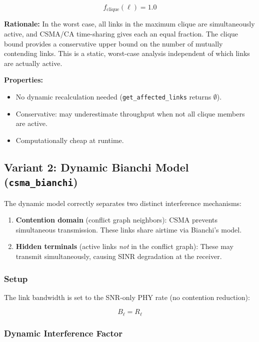 \documentclass[11pt,letterpaper]{article}
\begin{document}
\begin{equation}
f_\text{clique}(\ell) = 1.0
\end{equation}

\textbf{Rationale:} In the worst case, all links in the maximum clique are
simultaneously active, and CSMA/CA time-sharing gives each an equal fraction.
The clique bound provides a conservative upper bound on the number of mutually
contending links.  This is a static, worst-case analysis independent of which
links are actually active.

\textbf{Properties:}
\begin{itemize}[itemsep=2pt]
\item No dynamic recalculation needed (\texttt{get\_affected\_links} returns $\emptyset$).
\item Conservative: may underestimate throughput when not all clique members are active.
\item Computationally cheap at runtime.
\end{itemize}

\subsection{Variant 2: Dynamic Bianchi Model (\texttt{csma\_bianchi})}
\label{sec:bianchi_model}

The dynamic model correctly separates two distinct interference mechanisms:

\begin{enumerate}
\item \textbf{Contention domain} (conflict graph neighbors): CSMA prevents
  simultaneous transmission.  These links share airtime via Bianchi's model.
\item \textbf{Hidden terminals} (active links \emph{not} in the conflict graph):
  These may transmit simultaneously, causing SINR degradation at the receiver.
\end{enumerate}

\subsubsection{Setup}

The link bandwidth is set to the SNR-only PHY rate (no contention reduction):

\begin{equation}
B_\ell = R_\ell
\end{equation}

\subsubsection{Dynamic Interference Factor}
\end{document}
